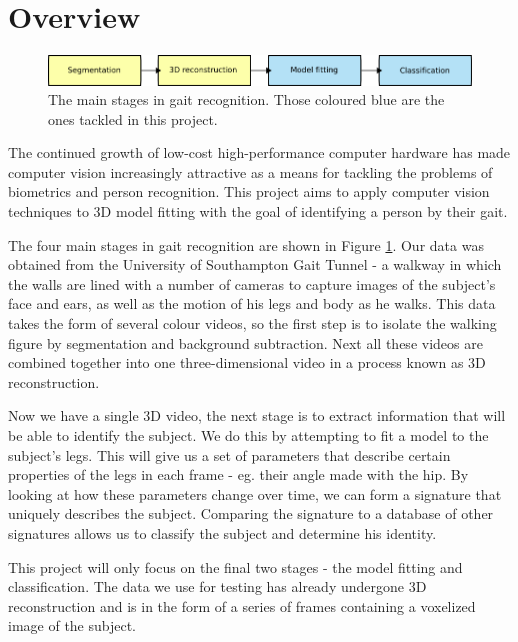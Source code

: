 \section{Overview}

\begin{figure}[b]
	\centering
	\includegraphics[width=12cm]{overview.png}
	\caption{The main stages in gait recognition.
		Those coloured blue are the ones tackled in this project.}
	\label{OverviewBoxes}
\end{figure}

The continued growth of low-cost high-performance computer hardware has made computer vision increasingly attractive as a means for tackling the problems of biometrics and person recognition.
This project aims to apply computer vision techniques to 3D model fitting with the goal of identifying a person by their gait.

The four main stages in gait recognition are shown in Figure \ref{OverviewBoxes}.
Our data was obtained from the University of Southampton Gait Tunnel -
a walkway in which the walls are lined with a number of cameras to capture images of the subject's face and ears, as well as the motion of his legs and body as he walks.
This data takes the form of several colour videos, so the first step is to isolate the walking figure by segmentation and background subtraction.
Next all these videos are combined together into one three-dimensional video in a process known as 3D reconstruction.

Now we have a single 3D video, the next stage is to extract information that will be able to identify the subject.
We do this by attempting to fit a model to the subject's legs.
This will give us a set of parameters that describe certain properties of the legs in each frame - eg. their angle made with the hip.
By looking at how these parameters change over time, we can form a signature that uniquely describes the subject.
Comparing the signature to a database of other signatures allows us to classify the subject and determine his identity.

This project will only focus on the final two stages - the model fitting and classification.
The data we use for testing has already undergone 3D reconstruction and is in the form of a series of frames containing a voxelized image of the subject.
